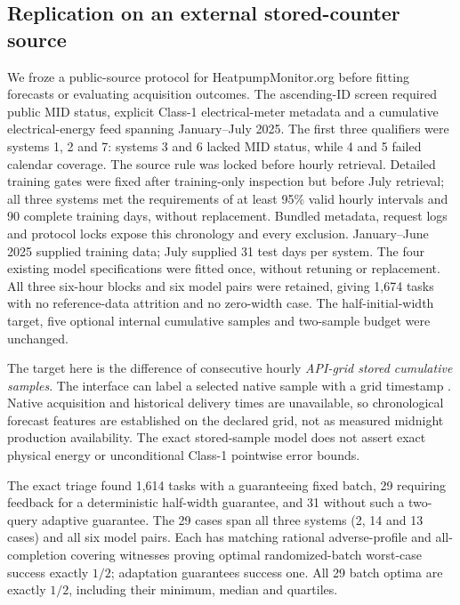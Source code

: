 \subsection{Replication on an external stored-counter source}
\label{sec:external-hpm}
We froze a public-source protocol for HeatpumpMonitor.org \citep{hpmabout,hpmapi} before fitting
forecasts or evaluating acquisition outcomes. The ascending-ID screen
required public MID status, explicit Class-1 electrical-meter metadata and
a cumulative electrical-energy feed spanning January--July 2025. The first
three qualifiers were systems 1, 2 and 7: systems 3 and 6 lacked MID status,
while 4 and 5 failed calendar coverage. The source rule was locked before
hourly retrieval. Detailed training gates were fixed after training-only
inspection but before July retrieval; all three systems met the requirements
of at least 95\% valid hourly intervals and 90 complete training days, without
replacement. Bundled metadata, request logs and protocol locks expose this
chronology and every exclusion. January--June 2025 supplied training data; July supplied 31 test
days per system. The four existing model specifications were fitted once,
without retuning or replacement. All three six-hour blocks and six model
pairs were retained, giving 1,674 tasks with no reference-data attrition
and no zero-width case. The half-initial-width target, five optional
internal cumulative samples and two-sample budget were unchanged.

The target here is the difference of consecutive hourly \emph{API-grid
stored cumulative samples}. The interface can label a selected native
sample with a grid timestamp \citep{hpmcode}. Native acquisition and historical delivery
times are unavailable, so chronological forecast features are established
on the declared grid, not as measured midnight production availability.
The exact stored-sample model does not assert exact physical energy or
unconditional Class-1 pointwise error bounds.

The exact triage found 1,614 tasks with a guaranteeing fixed batch, 29
requiring feedback for a deterministic half-width guarantee, and 31
without such a two-query adaptive guarantee. The 29 cases span all three
systems (2, 14 and 13 cases) and all six model pairs. Each has matching
rational adverse-profile and all-completion covering witnesses proving
optimal randomized-batch worst-case success exactly $1/2$; adaptation
guarantees success one. All 29 batch optima are exactly $1/2$, including
their minimum, median and quartiles.


